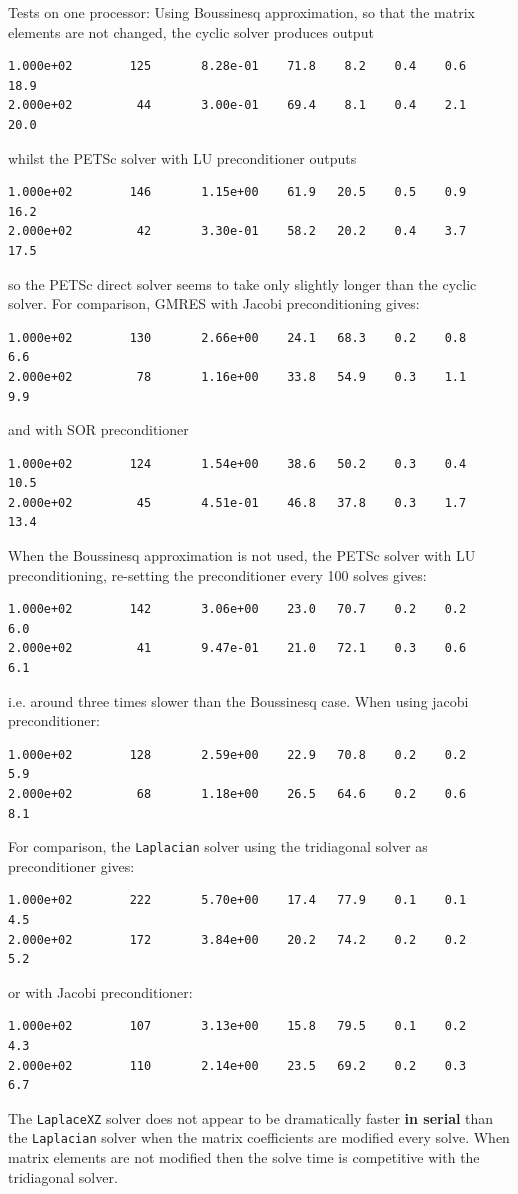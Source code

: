 \documentclass[12pt]{article}
\begin{document}
Tests on one processor: Using Boussinesq approximation, so that the matrix
elements are not changed, the cyclic solver produces output
%
\begin{verbatim}
1.000e+02        125       8.28e-01    71.8    8.2    0.4    0.6   18.9
2.000e+02         44       3.00e-01    69.4    8.1    0.4    2.1   20.0
\end{verbatim}
%
whilst the PETSc solver with LU preconditioner outputs
%
\begin{verbatim}
1.000e+02        146       1.15e+00    61.9   20.5    0.5    0.9   16.2
2.000e+02         42       3.30e-01    58.2   20.2    0.4    3.7   17.5
\end{verbatim}
%
so the PETSc direct solver seems to take only slightly longer than the cyclic
solver.  For comparison, GMRES with Jacobi preconditioning gives:
%
\begin{verbatim}
1.000e+02        130       2.66e+00    24.1   68.3    0.2    0.8    6.6
2.000e+02         78       1.16e+00    33.8   54.9    0.3    1.1    9.9
\end{verbatim}
%
and with SOR preconditioner
%
\begin{verbatim}
1.000e+02        124       1.54e+00    38.6   50.2    0.3    0.4   10.5
2.000e+02         45       4.51e-01    46.8   37.8    0.3    1.7   13.4
\end{verbatim}
%
When the Boussinesq approximation is not used, the PETSc solver with LU
preconditioning, re-setting the preconditioner every 100 solves gives:
%
\begin{verbatim}
1.000e+02        142       3.06e+00    23.0   70.7    0.2    0.2    6.0
2.000e+02         41       9.47e-01    21.0   72.1    0.3    0.6    6.1
\end{verbatim}
%
i.e. around three times slower than the Boussinesq case. When using jacobi
preconditioner:
%
\begin{verbatim}
1.000e+02        128       2.59e+00    22.9   70.8    0.2    0.2    5.9
2.000e+02         68       1.18e+00    26.5   64.6    0.2    0.6    8.1
\end{verbatim}
%
For comparison, the \texttt{Laplacian} solver using the tridiagonal solver as
preconditioner gives:
%
\begin{verbatim}
1.000e+02        222       5.70e+00    17.4   77.9    0.1    0.1    4.5
2.000e+02        172       3.84e+00    20.2   74.2    0.2    0.2    5.2
\end{verbatim}
%
or with Jacobi preconditioner:
%
\begin{verbatim}
1.000e+02        107       3.13e+00    15.8   79.5    0.1    0.2    4.3
2.000e+02        110       2.14e+00    23.5   69.2    0.2    0.3    6.7
\end{verbatim}
%
The \texttt{LaplaceXZ} solver does not appear to be dramatically faster {\bf in
serial} than the \texttt{Laplacian} solver when the matrix coefficients are
modified every solve. When matrix elements are not modified then the solve time
is competitive with the tridiagonal solver.
\end{document}
